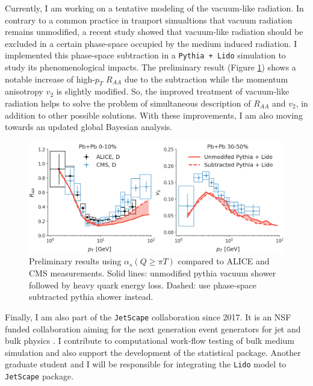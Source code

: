 \documentclass[12pt,a4paper]{revtex4-1}
\begin{document}
Currently, I am working on a tentative modeling of the vacuum-like radiation. 
In contrary to a common practice in tranport simualtions that vacuum radiation remains unmodified, a recent study \cite{Caucal:2018dla} showed that vacuum-like radiation should be excluded in a certain phase-space occupied by the medium induced radiation.
I implemented this phase-space subtraction in a {\tt Pythia + Lido} simulation to study its phenomenological impacts.
The preliminary result (Figure \ref{fig:prelim}) shows a notable increase of high-$p_T$ $R_{AA}$ due to the subtraction while the momentum anisotropy $v_2$ is slightly modified.
So, the improved treatment of vacuum-like radiation helps to solve the problem of simultaneous description of $R_{AA}$ and $v_2$, in addition to other possible solutions.
With these improvements, I am also moving towards an updated global Bayesian analysis.

\begin{figure}[ht]
\includegraphics[width=.85\textwidth]{Lido_obs.png}
\caption{Preliminary results using $\alpha_s(Q\geq\pi T)$ compared to ALICE \cite{Acharya:2018hre} and CMS \cite{Sirunyan:2017plt} measurements. Solid lines: unmodified pythia vacuum shower followed by heavy quark energy loss. Dashed: use phase-space subtracted pythia shower instead.}\label{fig:prelim}
\end{figure}

Finally, I am also part of the {\tt JetScape} collaboration since 2017. 
It is an NSF funded collaboration aiming for the next generation event generators for jet and bulk physics \cite{JetScape}. 
I contribute to computational work-flow testing of bulk medium simulation and also support the development of the statistical package.
Another graduate student and I will be responsible for integrating the {\tt Lido} model to {\tt JetScape} package.
\end{document}
